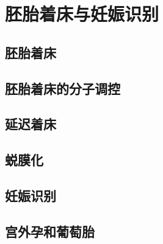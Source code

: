\chapter{胚胎着床与妊娠识别}

\section{胚胎着床}

\section{胚胎着床的分子调控}

\section{延迟着床}

\section{蜕膜化}

\section{妊娠识别}

\section{宫外孕和葡萄胎}